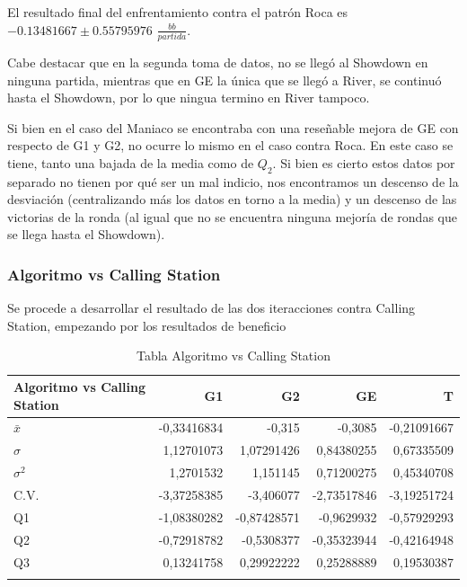 El resultado final del enfrentamiento contra el patrón Roca es $-0.13481667\pm0.55795976$ $\frac{bb}{partida}$.

\vspace{5mm} %

Cabe destacar que en la segunda toma de datos, no se llegó al Showdown en ninguna partida, mientras que en GE la única que se llegó a River, se continuó hasta el Showdown, por lo que ningua termino en River tampoco.

Si bien en el caso del Maniaco se encontraba con una reseñable mejora de GE con respecto de G1 y G2, no ocurre lo mismo en el caso contra Roca. En este caso se tiene, tanto una bajada de la media como de $Q_2$. Si bien es cierto estos datos por separado no tienen por qué ser un mal indicio, nos encontramos un descenso de la desviación (centralizando más los datos en torno a la media) y un descenso de las victorias de la ronda (al igual que no se encuentra ninguna mejoría de rondas que se llega hasta el Showdown). 


\clearpage


\subsubsection{Algoritmo vs Calling Station}

Se procede a desarrollar el resultado de las dos iteracciones contra Calling Station, empezando por los resultados de beneficio

\begin{longtable}[c]{lrrrr}
\hline
Algoritmo vs Calling Station & G1 & G2 & GE & T \\ \hline
$\bar{x}$ & -0,33416834 & -0,315 & -0,3085 & -0,21091667 \\ 
$\sigma$ & 1,12701073 & 1,07291426 & 0,84380255 & 0,67335509 \\ 
$\sigma^2$ & 1,2701532 & 1,151145 & 0,71200275 & 0,45340708 \\ 
C.V. & -3,37258385 & -3,406077 & -2,73517846 & -3,19251724 \\ 
Q1 & -1,08380282 & -0,87428571 & -0,9629932 & -0,57929293 \\ 
Q2 & -0,72918782 & -0,5308377 & -0,35323944 & -0,42164948 \\ 
Q3 & 0,13241758 & 0,29922222 & 0,25288889 & 0,19530387 \\ \hline
\caption{Tabla Algoritmo vs Calling Station}
\label{tab:AvC}
\end{longtable}


